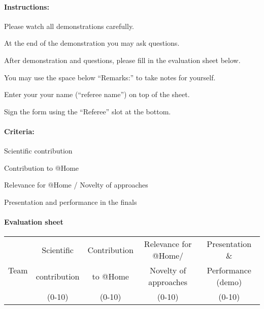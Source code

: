 \paragraph{Instructions:}
\begin{compactenum}
\item Please watch all demonstrations carefully.
\item At the end of the demonstration you may ask questions.
\item After demonstration and questions, please fill in the evaluation sheet below.
\item You may use the space below ``Remarks:'' to take notes for yourself.
\item Enter your your name (``referee name'') on top of the sheet.
\item Sign the form using the ``Referee'' slot at the bottom.
\end{compactenum}

\paragraph{Criteria:}
\begin{compactitem}
\item Scientific contribution
\item Contribution to @Home
\item Relevance for @Home / Novelty of approaches
\item Presentation and performance in the finals
\end{compactitem}



\paragraph{Evaluation sheet}
\begin{center}

\begingroup
\newcommand\tableTEAMS{}
\def\do#1{\appto\tableTEAMS{#1 & & & &  \\\hline}}%
\expandafter\docsvlist\expandafter{\TEAMSFINALS}

\begin{tabular}{|l|c|c|c|c|}
  \hline
  \multirow{3}{*}{Team}
  &  Scientific   & Contribution & Relevance for @Home/   &  Presentation \&  \\
  &  contribution & to @Home     & Novelty of approaches &  Performance (demo) \\
  &  (0-10)  &  (0-10) &  (0-10)   & (0-10) \\
  \hline
  \hline
  \tableTEAMS
\end{tabular}\\
\endgroup

\end{center}




